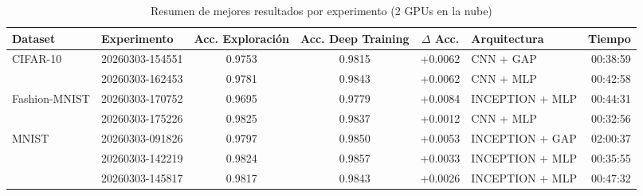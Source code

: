 \begin{table}[htbp]
\centering
\caption{Resumen de mejores resultados por experimento (2 GPUs en la nube)}
\label{tab:resultados_resumen}
\small
\begin{tabular}{llccclr}
\toprule
\textbf{Dataset} & \textbf{Experimento} & \textbf{Acc. Exploración} & \textbf{Acc. Deep Training} & \textbf{$\Delta$ Acc.} & \textbf{Arquitectura} & \textbf{Tiempo} \\
\midrule
  CIFAR-10 & 20260303-154551 & 0.9753 & 0.9815 & +0.0062 & CNN + GAP & 00:38:59 \\
   & 20260303-162453 & 0.9781 & 0.9843 & +0.0062 & CNN + MLP & 00:42:58 \\
\midrule
  Fashion-MNIST & 20260303-170752 & 0.9695 & 0.9779 & +0.0084 & INCEPTION + MLP & 00:44:31 \\
   & 20260303-175226 & 0.9825 & 0.9837 & +0.0012 & CNN + MLP & 00:32:56 \\
\midrule
  MNIST & 20260303-091826 & 0.9797 & 0.9850 & +0.0053 & INCEPTION + GAP & 02:00:37 \\
   & 20260303-142219 & 0.9824 & 0.9857 & +0.0033 & INCEPTION + MLP & 00:35:55 \\
   & 20260303-145817 & 0.9817 & 0.9843 & +0.0026 & INCEPTION + MLP & 00:47:32 \\
\bottomrule
\end{tabular}
\end{table}